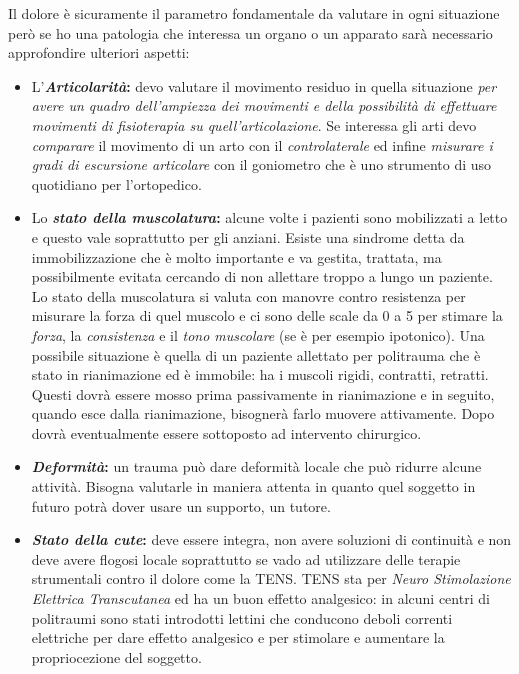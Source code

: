 \documentclass[]{article}
\begin{document}
Il dolore è sicuramente il parametro fondamentale da valutare in ogni
situazione però se ho una patologia che interessa un organo o un
apparato sarà necessario approfondire ulteriori aspetti:

\begin{itemize}
\item
  L'\textbf{\emph{Articolarità}:} devo valutare il movimento residuo in
  quella situazione \emph{per avere un quadro dell'ampiezza dei
  movimenti e della possibilità di effettuare movimenti di fisioterapia
  su quell'articolazione}. Se interessa gli arti devo \emph{comparare}
  il movimento di un arto con il \emph{controlaterale} ed infine
  \emph{misurare i gradi di escursione articolare} con il goniometro che
  è uno strumento di uso quotidiano per l'ortopedico.
\item
  Lo \textbf{\emph{stato della muscolatura}:} alcune volte i pazienti
  sono mobilizzati a letto e questo vale soprattutto per gli anziani.
  Esiste una sindrome detta da immobilizzazione che è molto importante e
  va gestita, trattata, ma possibilmente evitata cercando di non
  allettare troppo a lungo un paziente. Lo stato della muscolatura si
  valuta con manovre contro resistenza per misurare la forza di quel
  muscolo e ci sono delle scale da 0 a 5 per stimare la \emph{forza}, la
  \emph{consistenza} e il \emph{tono muscolare} (se è per esempio
  ipotonico). Una possibile situazione è quella di un paziente allettato
  per politrauma che è stato in rianimazione ed è immobile: ha i muscoli
  rigidi, contratti, retratti. Questi dovrà essere mosso prima
  passivamente in rianimazione e in seguito, quando esce dalla
  rianimazione, bisognerà farlo muovere attivamente. Dopo dovrà
  eventualmente essere sottoposto ad intervento chirurgico.
\item
  \textbf{\emph{Deformità}:} un trauma può dare deformità locale che può
  ridurre alcune attività. Bisogna valutarle in maniera attenta in
  quanto quel soggetto in futuro potrà dover usare un supporto, un
  tutore.
\item
  \textbf{\emph{Stato della cute}:} deve essere integra, non avere
  soluzioni di continuità e non deve avere flogosi locale soprattutto se
  vado ad utilizzare delle terapie strumentali contro il dolore come la
  TENS. TENS sta per \emph{Neuro Stimolazione Elettrica Transcutanea} ed
  ha un buon effetto analgesico: in alcuni centri di politraumi sono
  stati introdotti lettini che conducono deboli correnti elettriche per
  dare effetto analgesico e per stimolare e aumentare la propriocezione
  del soggetto.
\end{itemize}
\end{document}
